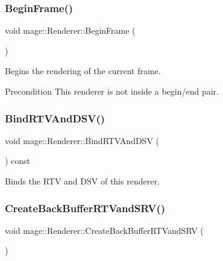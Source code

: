 \subsubsection{\texorpdfstring{Begin\+Frame()}{BeginFrame()}}
{\footnotesize\ttfamily void mage\+::\+Renderer\+::\+Begin\+Frame (\begin{DoxyParamCaption}{ }\end{DoxyParamCaption})\hspace{0.3cm}{\ttfamily [noexcept]}}

Begins the rendering of the current frame.

\begin{DoxyPrecond}{Precondition}
This renderer is not inside a begin/end pair. 
\end{DoxyPrecond}
\hypertarget{classmage_1_1_renderer_a97b7b1563939688072fa94341d29cc2c}{}\label{classmage_1_1_renderer_a97b7b1563939688072fa94341d29cc2c} 
\subsubsection{\texorpdfstring{Bind\+R\+T\+V\+And\+D\+S\+V()}{BindRTVAndDSV()}}
{\footnotesize\ttfamily void mage\+::\+Renderer\+::\+Bind\+R\+T\+V\+And\+D\+SV (\begin{DoxyParamCaption}{ }\end{DoxyParamCaption}) const\hspace{0.3cm}{\ttfamily [noexcept]}}

Binds the R\+TV and D\+SV of this renderer. \hypertarget{classmage_1_1_renderer_a07a727853102d747677d61dec379f58e}{}\label{classmage_1_1_renderer_a07a727853102d747677d61dec379f58e} 
\subsubsection{\texorpdfstring{Create\+Back\+Buffer\+R\+T\+Vand\+S\+R\+V()}{CreateBackBufferRTVandSRV()}}
{\footnotesize\ttfamily void mage\+::\+Renderer\+::\+Create\+Back\+Buffer\+R\+T\+Vand\+S\+RV (\begin{DoxyParamCaption}{ }\end{DoxyParamCaption})\hspace{0.3cm}{\ttfamily [private]}}

